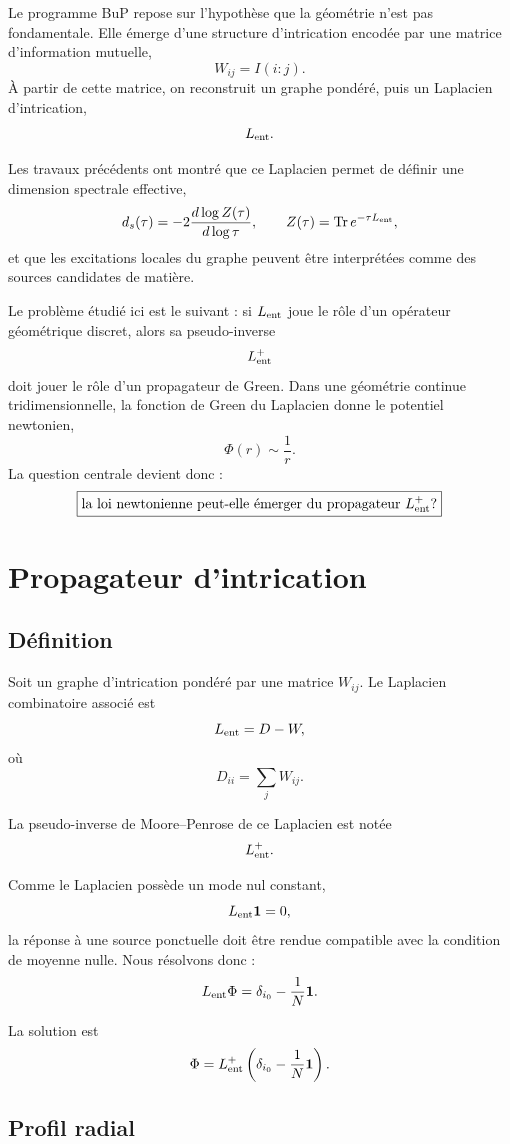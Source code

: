 \documentclass[11pt,a4paper]{article}
\begin{document}
Le programme BuP repose sur l'hypothèse que la géométrie n'est pas fondamentale.
Elle émerge d'une structure d'intrication encodée par une matrice d'information
mutuelle,
\[
W_{ij}=I(i:j).
\]
À partir de cette matrice, on reconstruit un graphe pondéré, puis un Laplacien
d'intrication,
\[
L_{\rm ent}.
\]

Les travaux précédents ont montré que ce Laplacien permet de définir une
dimension spectrale effective,
\[
d_s(\tau)
=
-2
\frac{d\log Z(\tau)}{d\log \tau},
\qquad
Z(\tau)=\Tr e^{-\tau L_{\rm ent}},
\]
et que les excitations locales du graphe peuvent être interprétées comme des
sources candidates de matière.

Le problème étudié ici est le suivant : si \(L_{\rm ent}\) joue le rôle d'un
opérateur géométrique discret, alors sa pseudo-inverse
\[
L_{\rm ent}^{+}
\]
doit jouer le rôle d'un propagateur de Green. Dans une géométrie continue
tridimensionnelle, la fonction de Green du Laplacien donne le potentiel
newtonien,
\[
\Phi(r)\sim \frac{1}{r}.
\]
La question centrale devient donc :
\[
\boxed{
\text{la loi newtonienne peut-elle émerger du propagateur }L_{\rm ent}^{+}?
}
\]

\section{Propagateur d'intrication}

\subsection{Définition}

Soit un graphe d'intrication pondéré par une matrice \(W_{ij}\). Le Laplacien
combinatoire associé est
\[
L_{\rm ent}
=
D-W,
\]
où
\[
D_{ii}
=
\sum_j W_{ij}.
\]

La pseudo-inverse de Moore--Penrose de ce Laplacien est notée
\[
L_{\rm ent}^{+}.
\]

Comme le Laplacien possède un mode nul constant,
\[
L_{\rm ent}\mathbf{1}=0,
\]
la réponse à une source ponctuelle doit être rendue compatible avec la
condition de moyenne nulle. Nous résolvons donc :
\[
L_{\rm ent}\Phi
=
\delta_{i_0}
-
\frac{1}{N}\mathbf{1}.
\]

La solution est
\[
\Phi
=
L_{\rm ent}^{+}
\left(
\delta_{i_0}
-
\frac{1}{N}\mathbf{1}
\right).
\]

\subsection{Profil radial}
\end{document}
